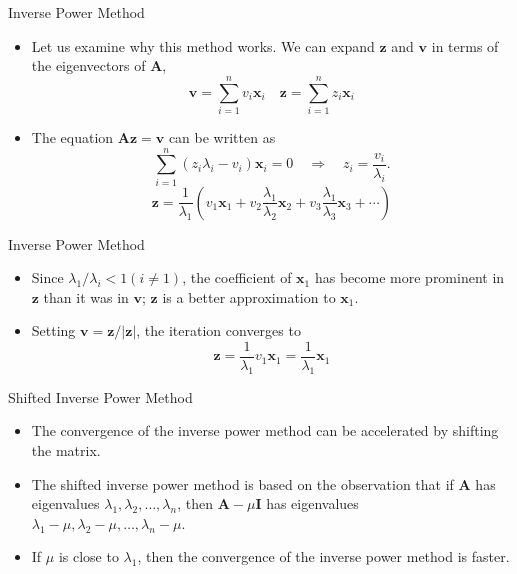 \documentclass{beamer}
\begin{document}
\begin{frame}{Inverse Power Method}
    \begin{itemize}
        \item Let us examine why this method works. We can expand 
        $\mathbf{z}$ and $\mathbf{v}$ in terms of the eigenvectors of $\mathbf{A}$,
        \[
            \mathbf{v}=\sum_{i=1}^n v_i \mathbf{x}_i \quad \mathbf{z}=\sum_{i=1}^n z_i \mathbf{x}_i
        \]
        \item The equation $\mathbf{A z}=\mathbf{v}$ can be written as
        \[
            \sum_{i=1}^n ( z_i \lambda_i - v_i )\mathbf{x}_i=0 \quad \Rightarrow \quad z_i=\frac{v_i}{\lambda_i}.
        \]
        \[
            \mathbf{z} 
             =\frac{1}{\lambda_1}\left(v_1 \mathbf{x}_1+v_2 \frac{\lambda_1}{\lambda_2} \mathbf{x}_2+v_3 \frac{\lambda_1}{\lambda_3} \mathbf{x}_3+\cdots\right)
            \]

    \end{itemize}
\end{frame}
\begin{frame}{Inverse Power Method}
    \begin{itemize}
        \item Since $\lambda_1 / \lambda_i<1(i \neq 1)$,  the coefficient of $\mathbf{x}_1$ has become more prominent
         in $\mathbf{z}$ than it was in $\mathbf{v}$; $\mathbf{z}$ is a better approximation to $\mathbf{x}_1$. 
         \item Setting $\mathbf{v}=\mathbf{z}/|\mathbf{z}|$, the iteration converges to
         \[ 
         \mathbf{z}=\frac{1}{\lambda_1} v_1 \mathbf{x}_1=\frac{1}{\lambda_1} \mathbf{x}_1
         \]
    \end{itemize}
\end{frame}
\begin{frame}{Shifted Inverse Power Method}
    \begin{itemize}
        \item The convergence of the inverse power method can be accelerated by shifting the matrix.
        \item The shifted inverse power method is based on the observation that if $\mathbf{A}$ has eigenvalues $\lambda_1, \lambda_2, \ldots, \lambda_n$, then $\mathbf{A}-\mu \mathbf{I}$ has eigenvalues $\lambda_1-\mu, \lambda_2-\mu, \ldots, \lambda_n-\mu$.
        \item If $\mu$ is close to $\lambda_1$, then the convergence of the inverse power method is faster.
    \end{itemize}
\end{frame}
\end{document}

